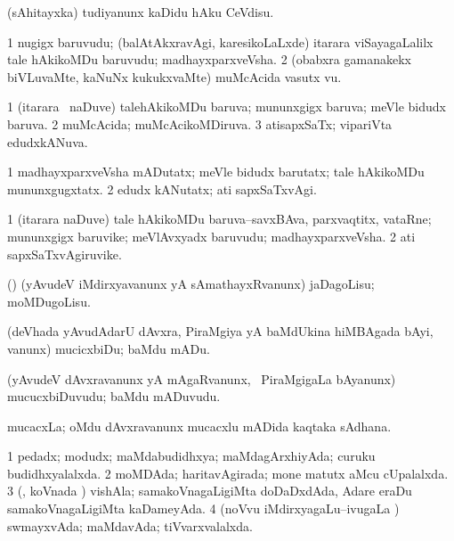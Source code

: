 \bentry
{}
\gl{\sakirx}
\bmng
(sAhitayxka) tudiyanunx kaDidu hAku CeVdisu. 
\emng
\eentry

\bentry
{}
\gl{\nA}
\bmng
\bnum
\num{1} nugigx baruvudu; (balAtAkxravAgi, karesikoLaLxde) itarara viSayagaLalilx tale hAkikoMDu baruvudu; madhayxparxveVsha. 
\num{2} (obabxra gamanakekx biVLuvaMte, kaNuNx kukukxvaMte) muMcAcida vasutx \mo vu. 
\enum
\emng
\eentry

\bentry
{}
\gl{\gu}
\bmng
\bnum
\num{1} (itarara \vi\ naDuve) talehAkikoMDu baruva; mununxgigx baruva; meVle bidudx baruva. 
\num{2} muMcAcida; muMcAcikoMDiruva. 
\num{3} atisapxSaTx; vipariVta edudxkANuva. 
\enum
\emng
\eentry

\bentry
{}
\gl{\kirxvi}
\bmng
\bnum
\num{1} madhayxparxveVsha mADutatx; meVle bidudx barutatx; tale hAkikoMDu mununxgugxtatx. 
\num{2} edudx kANutatx; ati sapxSaTxvAgi. 
\enum
\emng
\eentry

\bentry
{}
\gl{\nA}
\bmng
\bnum
\num{1} (itarara naDuve) tale hAkikoMDu baruva--savxBAva, parxvaqtitx, vataRne; mununxgigx baruvike; meVlAvxyadx baruvudu; madhayxparxveVsha. 
\num{2} ati sapxSaTxvAgiruvike. 
\enum
\emng
\eentry

\bentry
{}
\gl{\sakirx}
\bmng
(\veYshA) (yAvudeV iMdirxyavanunx yA sAmathayxRvanunx) jaDagoLisu; moMDugoLisu. 
\emng
\eentry

\bentry
{}
\gl{\sakirx}
\bmng
(deVhada yAvudAdarU dAvxra, PiraMgiya yA baMdUkina hiMBAgada bAyi, \mo vanunx) mucicxbiDu; baMdu mADu. 
\emng
\eentry

\bentry
{}
\gl{\nA}
\bmng
(yAvudeV dAvxravanunx yA mAgaRvanunx, \kanmu\ PiraMgigaLa bAyanunx) mucucxbiDuvudu; baMdu mADuvudu. 
\emng
\eentry

\bentry
{}
\gl{\nA}
\bmng
mucacxLa; oMdu dAvxravanunx mucacxlu mADida kaqtaka sAdhana. 
\emng
\eentry

\bentry
{}
\gl{\gu}
\bmng
\bnum
\num{1} pedadx; modudx; maMdabudidhxya; maMdagArxhiyAda; curuku budidhxyalalxda. 
\num{2} moMDAda; haritavAgirada; mone matutx aMcu cUpalalxda. 
\num{3} (\jAyx, koVnada \vi) vishAla; samakoVnagaLigiMta doDaDxdAda, Adare eraDu samakoVnagaLigiMta kaDameyAda. 
\num{4} (noVvu iMdirxyagaLu--ivugaLa \vi) swmayxvAda; maMdavAda; tiVvarxvalalxda. 
\enum
\emng
\eentry


